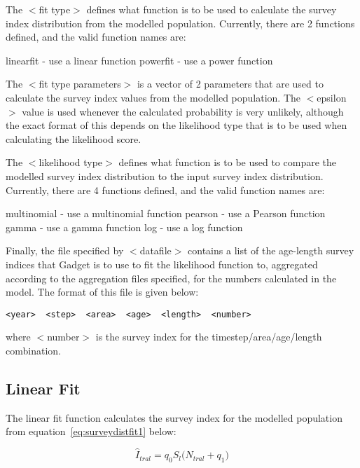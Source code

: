 \documentclass [a4paper, 10pt]{book}
\begin{document}
\bigskip
The $<$fit type$>$ defines what function is to be used to calculate the survey index distribution from the modelled population.  Currently, there are 2 functions defined, and the valid function names are:

\bigskip
linearfit - use a linear function\newline
powerfit - use a power function

\bigskip
The $<$fit type parameters$>$ is a vector of 2 parameters that are used to calculate the survey index values from the modelled population.  The $<$epsilon$>$ value is used whenever the calculated probability is very unlikely, although the exact format of this depends on the likelihood type that is to be used when calculating the likelihood score.

\bigskip
The $<$likelihood type$>$ defines what function is to be used to compare the modelled survey index distribution to the input survey index distribution.  Currently, there are 4 functions defined, and the valid function names are:

\bigskip
multinomial - use a multinomial function\newline
pearson - use a Pearson function\newline
gamma - use a gamma function\newline
log - use a log function

\bigskip
Finally, the file specified by $<$datafile$>$ contains a list of the age-length survey indices that Gadget is to use to fit the likelihood function to, aggregated according to the aggregation files specified, for the numbers calculated in the model.  The format of this file is given below:

{\small\begin{verbatim}
<year>  <step>  <area>  <age>  <length>  <number>
\end{verbatim}}

where $<$number$>$ is the survey index for the timestep/area/age/length combination.

\subsection{Linear Fit}
The linear fit function calculates the survey index for the modelled population from equation~\ref{eq:surveydistfit1} below:

\begin{equation}\label{eq:surveydistfit1}
\widehat{I}_{tral} = q_{0} S_{l} \big( N_{tral} + q_{1} \big)
\end{equation}
\end{document}
